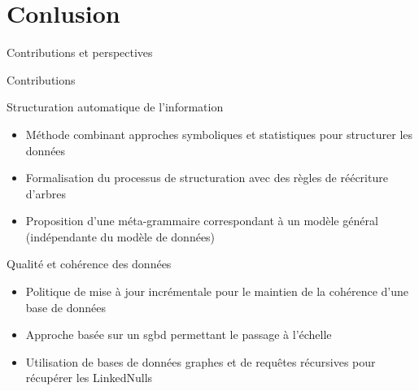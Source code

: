 \documentclass[english,french,table,aspectratio=43]{beamer}
\renewcommand{\_}{\ifincsname_\else\legacyunderscore\fi}
\begin{document}

%

\section{Conlusion}

\begin{frame}{}
    \begin{block}{}
        \Large
        \centering
        \vspace{.5em}
        Contributions et perspectives
        \vspace{.5em}
    \end{block}
\end{frame}

\begin{frame}{Contributions}
    \begin{block}{Structuration automatique de l'information}
        \begin{itemize}
            \item Méthode combinant approches symboliques et statistiques pour structurer les données
            \item Formalisation du processus de structuration avec des règles de réécriture d'arbres
            \item Proposition d'une méta-grammaire correspondant à un modèle général (indépendante du modèle de données)
        \end{itemize}
    \end{block}
    \begin{block}{Qualité et cohérence des données}
        \begin{itemize}
            \item Politique de mise à jour incrémentale pour le maintien de la cohérence d'une base de données
            \item Approche basée sur un \acrshort{sgbd} permettant le passage à l'échelle
            \item Utilisation de bases de données graphes et de requêtes récursives pour récupérer les LinkedNulls
        \end{itemize}
    \end{block}
\end{frame}
\end{document}
